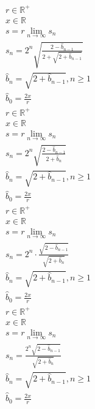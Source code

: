 \documentclass[a4paper,12pt]{report}
\begin{document}
\begin{subequations}
\begin{gather}
r \in \mathbb{R}^+ \\
x \in \mathbb{R} \\
s = r \lim \limits_{n \to \infty} s_n \\
s_n = 2^n \sqrt{\frac{2 - \hat{b}_{n-1}}{2 + \sqrt{2 + \hat{b}_{n-1}}}} \\
\hat{b}_n = \sqrt{2 + \hat{b}_{n-1}}, n \geq 1 \\
\hat{b}_0 = \frac{2x}{r}
\end{gather}
\end{subequations}
\begin{subequations}
\begin{gather}
r \in \mathbb{R}^+ \\
x \in \mathbb{R} \\
s = r \lim \limits_{n \to \infty} s_n \\
s_n = 2^n \sqrt{\frac{2 - \hat{b}_{n-1}}{2 + \hat{b}_n}} \\
\hat{b}_n = \sqrt{2 + \hat{b}_{n-1}}, n \geq 1 \\
\hat{b}_0 = \frac{2x}{r}
\end{gather}
\end{subequations}
\begin{subequations}
\begin{gather}
r \in \mathbb{R}^+ \\
x \in \mathbb{R} \\
s = r \lim \limits_{n \to \infty} s_n \\
s_n = 2^n \cdot \frac{\sqrt{2 - \hat{b}_{n-1}}}{\sqrt{2 + \hat{b}_n}} \\
\hat{b}_n = \sqrt{2 + \hat{b}_{n-1}}, n \geq 1 \\
\hat{b}_0 = \frac{2x}{r}
\end{gather}
\end{subequations}
\begin{subequations}
\begin{gather}
r \in \mathbb{R}^+ \\
x \in \mathbb{R} \\
s = r \lim \limits_{n \to \infty} s_n \\
s_n = \frac{2^n \sqrt{2 - \hat{b}_{n-1}}}{\sqrt{2 + \hat{b}_n}} \\
\hat{b}_n = \sqrt{2 + \hat{b}_{n-1}}, n \geq 1 \\
\hat{b}_0 = \frac{2x}{r}
\end{gather}
\end{subequations}
\end{document}
